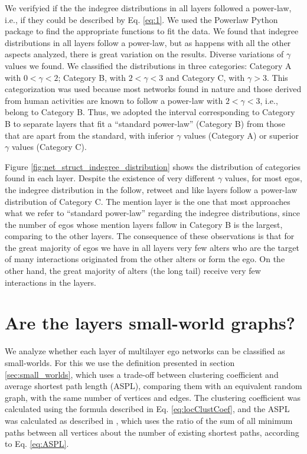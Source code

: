 We verifyied if the the indegree distributions in all layers followed a power-law, i.e., if they could be described by Eq. \ref{eq:1}. We used the Powerlaw Python package \cite{Alstott2014} to find the appropriate functions to fit the data. We found that indegree distributions in all layers follow a power-law, but as happens with all the other aspects analyzed, there is great variation on the results. Diverse variations of $\gamma$ values we found. We classified the distributions in three categories: Category A with $0<\gamma <2$; Category B, with $2<\gamma<3$ and Category C, with $\gamma> 3$. This categorization was used because most networks found in nature and those derived from human activities are known to follow a power-law with $2<\gamma<3$, i.e., belong to Category B. Thus, we adopted the interval corresponding to Category B to separate layers  that fit a “standard power-law” (Category B) from those that are apart from the standard, with inferior $\gamma$ values (Category A) or superior $\gamma$ values (Category C).

Figure \ref{fig:net_struct_indegree_distribution} shows the distribution of categories found in each layer. Despite the existence of very different $\gamma$ values, for most egos, the indegree distribution in the follow, retweet and like layers follow a power-law distribution of Category C. The mention layer is the one that most approaches what we refer to “standard power-law” regarding  the indegree distributions, since the number of egos whose mention layers fallow in Category B is the largest, comparing to the other layers. The consequence of these observations is that for the great majority of egos we have in all layers  very few alters who are the target of many interactions originated from the other alters or form the ego. On the other hand, the great majority of alters (the long tail) receive very few interactions in the layers. 






\section{Are the layers small-world graphs?}
\label{sec:QuestionSmallWorld}

We analyze whether each layer of multilayer ego networks can be classified as small-worlds. For this we use the definition presented in section \ref{sec:small_worlds}, which uses a trade-off between clustering coefficient and average shortest path length (ASPL), comparing them with an equivalent random graph, with the same number of vertices and edges. The clustering coefficient was calculated using the formula described in Eq. \ref{eq:locClustCoef}, and the ASPL was calculated as described in \cite{Mao2013}, which uses the ratio of the sum of all minimum paths between all vertices about the number of existing shortest paths, according to Eq. \ref{eq:ASPL}.

